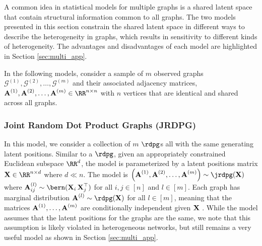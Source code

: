 A common idea in statistical models for multiple graphs is a shared latent space that contain structural information common to all graphs. The two models presented in this section constrain the shared latent space in different ways to describe the heterogeneity in graphs, which results in sensitivity to different kinds of heterogeneity. The advantages and disadvantages of each model are highlighted in Section \ref{sec:multi_app}.

In the following models, consider a sample of $m$ observed graphs $\mathcal{G}^{(1)}, \mathcal{G}^{(2)}, \ldots, \mathcal{G}^{(m)}$  and their associated adjacency matrices, $\A^{(1)}, \A^{(2)}, \ldots, \A^{(m)}\in\RR^{n\times n}$ with $n$ vertices that are identical and shared across all graphs. 

\subsubsection{Joint Random Dot Product Graphs (JRDPG)}
In this model, we consider a collection of $m$ $\rdpg$s all with the same generating latent positions. Similar to a $\rdpg$, given an appropriately constrained Euclidean subspace $\RR^d$, the model is parameterized by a latent positions matrix $\X\in\RR^{n\times d}$ where $d \ll n$. The model is $\left(\A^{(1)}, \A^{(2)}, \ldots, \A^{(m)}\right)\sim \jrdpg(\X)$ where $\A_{ij}^{(l)}\sim \bern(\X_i\X_j^\top)$ for all $i, j \in [n]$ and $l\in [m]$. Each graph has marginal distribution $\A^{(l)}\sim\rdpg(\X)$ for all $l \in [m]$, meaning that the matrices $\operatorname{\mathbf{A}}^{(1)}, \ldots,\operatorname{\mathbf{A}}^{(m)}$ are conditionally independent given $\operatorname{\mathbf{X}}$ \citep{athreya2017statistical,levin2017central}. While the model assumes that the latent positions for the graphs are the same, we note that this assumption is likely violated in heterogeneous networks, but still remains a very useful model as shown in Section \ref{sec:multi_app}.

